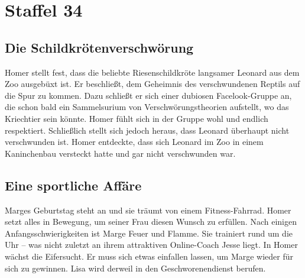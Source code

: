 \section{Staffel 34}

\subsection{Die Schildkrötenverschwörung}\label{UABF16}
Homer stellt fest, dass die beliebte Riesenschildkröte langsamer Leonard aus dem Zoo ausgebüxt ist. Er beschließt, dem Geheimnis des verschwundenen Reptils auf die Spur zu kommen. Dazu schließt er sich einer dubiosen Facelook-Gruppe an, die schon bald ein Sammelsurium von Verschwörungstheorien aufstellt, wo das Kriechtier sein könnte. Homer fühlt sich in der Gruppe wohl und endlich respektiert. Schließlich stellt sich jedoch heraus, dass Leonard überhaupt nicht verschwunden ist. Homer entdeckte, dass sich Leonard im Zoo in einem Kaninchenbau versteckt hatte und gar nicht verschwunden war.


\subsection{Eine sportliche Affäre}\label{UABF19}
Marges Geburtstag steht an und sie träumt von einem Fitness-Fahrrad. Homer setzt alles in Bewegung, um seiner Frau diesen Wunsch zu erfüllen. Nach einigen Anfangsschwierigkeiten ist Marge Feuer und Flamme. Sie trainiert rund um die Uhr -- was nicht zuletzt an ihrem attraktiven Online-Coach Jesse liegt. In Homer wächst die Eifersucht. Er muss sich etwas einfallen lassen, um Marge wieder für sich zu gewinnen. Lisa wird derweil in den Geschworenendienst berufen.

